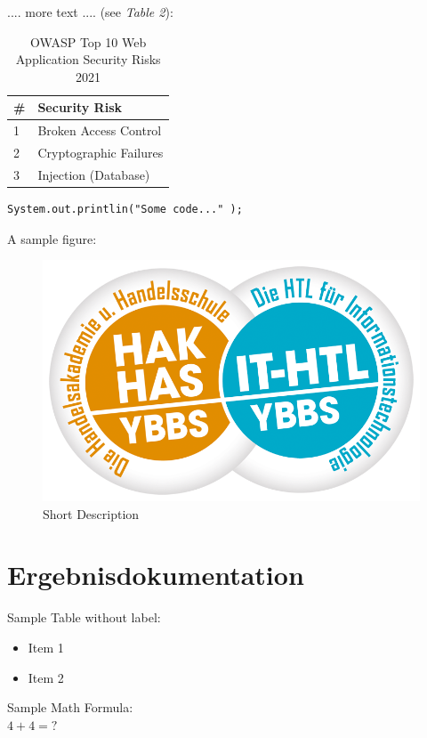.... more text ....  (see \emph{Table 2}):

\begin{table} [H]
	\begin{tabular}{ |p{2cm}| p{11.0cm}| }
		\hline
		\textbf{\#}& \textbf{Security Risk}\\
		\hline
		1 & Broken Access Control \\
		2 & Cryptographic Failures \\
		3 & Injection (Database) \\
		\hline
	\end{tabular}
	\caption{\label{tab:OWASP2021} OWASP Top 10 Web Application Security Risks 2021}
\end{table}

\begin{lstlisting}
System.out.printlin("Some code..." );
\end{lstlisting}



A sample figure: \\

\begin{figure}[H]
	\centering
	\includegraphics[width=0.5\linewidth]{images/SZ-Ybbs-Logo}
	\caption[Short Description]{Short Description}
	\label{fig:sz-ybbs-logo}
\end{figure}

\chapter{Ergebnisdokumentation}

Sample Table without label:

\begin{itemize}
	\item 	Item 1
	\item 	Item 2
\end{itemize}

Sample Math Formula: \\

$4 + 4 = ?$ \\


